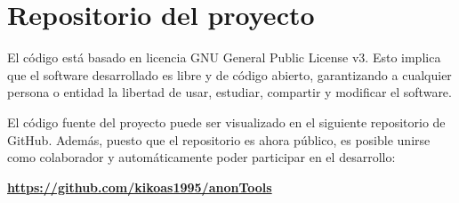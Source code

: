 \chapter{Repositorio del proyecto}
\label{Anexo:repositorio}

El código está basado en licencia GNU General Public License v3. Esto implica que el software desarrollado es libre y de código abierto, garantizando a cualquier persona o entidad la libertad de usar, estudiar, compartir y modificar el software. 

El código fuente del proyecto puede ser visualizado en el siguiente repositorio de GitHub. Además, puesto que el repositorio es ahora público, es posible unirse como colaborador y automáticamente poder participar en el desarrollo:

\textbf{\url{https://github.com/kikoas1995/anonTools}}
\newpage \thispagestyle{empty} %